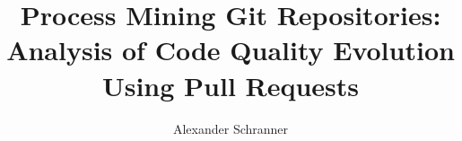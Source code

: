 \documentclass[bachelor]{padsthesis}
\begin{document}
\author{Alexander Schranner}
\title{Process Mining Git Repositories: Analysis of Code Quality Evolution Using Pull Requests}

\maketitle

\frontmatter

%



\tableofcontents
\listoffigures
\listoftables

\mainmatter









% 




















\backmatter
\printbibliography
\end{document}
